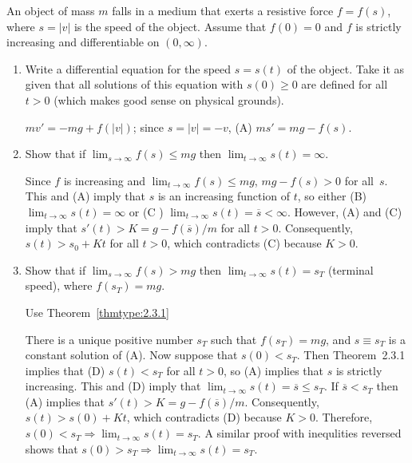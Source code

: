 \documentclass{ximera}
\begin{document}
\begin{problem}\label{exer:4.3.14}
An object of mass $m$ falls in a medium that exerts a resistive force
$f=f(s)$, where $s=|v|$ is the speed of the object. Assume that
$f(0)=0$ and $f$ is strictly increasing and differentiable on
$(0,\infty)$.
\begin{enumerate}
\item %
Write a differential equation for the speed $s=s(t)$ of the object.
Take it as given that all solutions of this equation with $s(0)\ge0$
are defined for all $t>0$ (which makes good sense on physical
grounds).

\begin{solution}
$mv'=-mg+f(|v|)$; since $s=|v|=-v$, (A) $ms'=mg-f(s)$.
\end{solution}

\item %
Show that if $\lim_{s\to\infty}f(s)\le mg$ then
$\lim_{t\to\infty}s(t)=\infty$.

\begin{solution}
Since $f$ is increasing and $\lim_{t\to\infty}f(s)\le mg$,
$mg-f(s)>0$ for all~$s$. This and (A) imply that $s$ is an increasing
function of $t$, so either (B) $\lim_{t\to\infty}s(t)=\infty$
or (C ) $\lim_{t\to\infty}s(t)=\overline s<\infty$. However,
(A) and (C) imply that $s'(t)>K=g-f(\overline s)/m$ for all $t>0$.
Consequently, $s(t)>s_0+Kt$ for all $t>0$, which contradicts (C)
because $K>0$.
\end{solution}

\item\label{exer:4.3.14c} %
Show that if $\lim_{s\to\infty}f(s)>mg$ then
$\lim_{t\to\infty}s(t)=s_T$ (terminal speed), where $f(s_T)=mg$.
\begin{hint}
    Use Theorem~\ref{thmtype:2.3.1}
\end{hint}

\begin{solution}
There is a unique positive number $s_T$ such that
$f(s_T)=mg$, and $s\equiv s_T$ is a constant solution of (A).
Now suppose that $s(0)<s_T$. Then Theorem~2.3.1
implies that (D) $s(t)<s_T$ for all $t>0$, so (A) implies that
$s$ is strictly increasing. This and (D) imply that
$\lim_{t\to\infty}s(t)=\overline s\le s_T$. If $\overline s<s_T$
then (A) implies that $s'(t)>K=g-f(\overline s)/m$. Consequently,
$s(t)>s(0)+Kt$, which contradicts (D) because $K>0$. Therefore,
$s(0)<s_T\Rightarrow\lim_{t\to\infty}s(t)=s_T$. A similar proof with
inequlities reversed shows that
$s(0)>s_T\Rightarrow\lim_{t\to\infty}s(t)=s_T$.
\end{solution}

\end{enumerate}
\end{problem}
\end{document}
